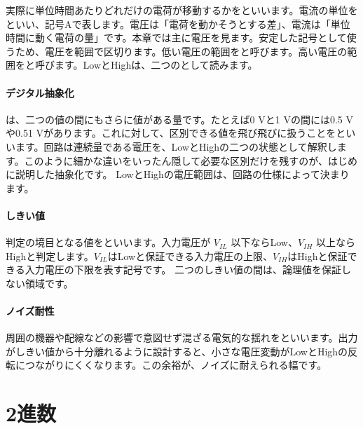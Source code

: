 実際に単位時間あたりどれだけの電荷が移動するかをといいます。電流の単位をといい、記号Aで表します。電圧は「電荷を動かそうとする差」、電流は「単位時間に動く電荷の量」です。本章では主に電圧を見ます。安定した記号として使うため、電圧を範囲で区切ります。低い電圧の範囲をと呼びます。高い電圧の範囲をと呼びます。LowとHighは、二つのとして読みます。

\begingroup
\begingroup
\paragraph{デジタル抽象化}
        は、二つの値の間にもさらに値がある量です。たとえば0 Vと1 Vの間には0.5 Vや0.51 Vがあります。これに対して、区別できる値を飛び飛びに扱うことをといいます。回路は連続量である電圧を、LowとHighの二つの状態として解釈します。このように細かな違いをいったん隠して必要な区別だけを残すのが、はじめに説明した抽象化です。
        LowとHighの電圧範囲は、回路の仕様によって決まります。

\paragraph{しきい値}
        判定の境目となる値をといいます。入力電圧が $V_{IL}$ 以下ならLow、$V_{IH}$ 以上ならHighと判定します。$V_{IL}$はLowと保証できる入力電圧の上限、$V_{IH}$はHighと保証できる入力電圧の下限を表す記号です。
        二つのしきい値の間は、論理値を保証しない領域です。

\par
\endgroup
\medskip
\begingroup
      \centering
      \vspace{4mm}
\paragraph{ノイズ耐性}
        周囲の機器や配線などの影響で意図せず混ざる電気的な揺れをといいます。出力がしきい値から十分離れるように設計すると、小さな電圧変動がLowとHighの反転につながりにくくなります。この余裕が、ノイズに耐えられる幅です。

\par
\endgroup
\par
\endgroup


\section{2進数}
\label{sec:01-digital-computer-02}

